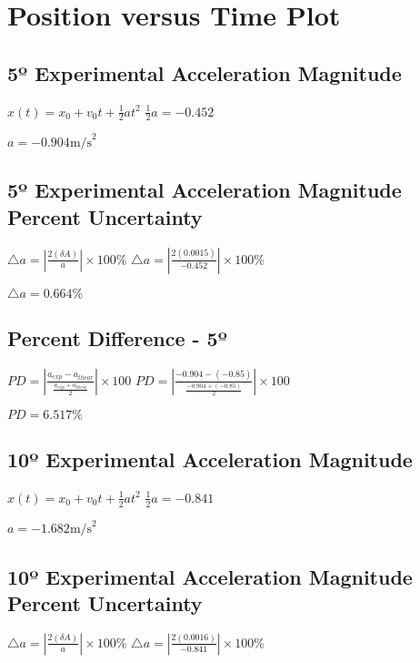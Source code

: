 \documentclass{article}
\begin{document}
\section{Position versus Time Plot}
\subsection{5º Experimental Acceleration Magnitude}
$x(t)= x_0 + v_0t + \frac{1}{2}at^2$
\newline
$\frac {1}{2}a = -0.452$
\newline



$a=-0.904 \text {m/s}^2$
\newline 
\subsection{5º Experimental Acceleration Magnitude Percent Uncertainty}
$\triangle a = |\frac {2(\delta A)}{a}| \times 100 \%$
\newline
$\triangle a = |\frac {2(0.0015)}{-0.452}| \times 100 \%$
\newline



$\triangle a = 0.664 \%$

\subsection{Percent Difference - 5º}
$PD = \left| \frac {a_{exp}-a_{theor}}{\frac {a_{exp}+a_{theor}}{2}}\right| \times 100$
\newline
\newline
$PD = \left| \frac {-0.904-(-0.85)}{\frac {-0.904+(-0.85)}{2}}\right| \times 100$
\newline 
\newline




$PD=6.517\%$
\subsection{10º Experimental Acceleration Magnitude}
$x(t)= x_0 + v_0t + \frac{1}{2}at^2$
\newline
$\frac {1}{2}a = -0.841$
\newline



$a=-1.682 \text {m/s}^2$
\newline 

\subsection{10º Experimental Acceleration Magnitude Percent Uncertainty}
$\triangle a = |\frac {2(\delta A)}{a}| \times 100 \%$
\newline
$\triangle a = |\frac {2(0.0016)}{-0.841}| \times 100 \%$
\newline
\end{document}
